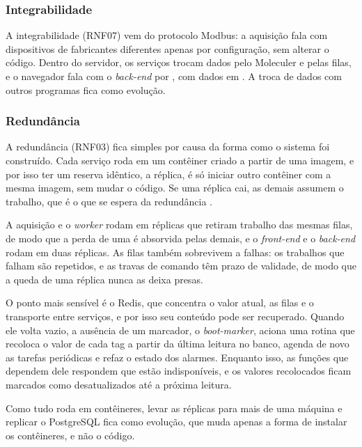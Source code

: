 \subsubsection{Integrabilidade}

\par A integrabilidade (RNF07) vem do protocolo Modbus: a aquisição fala com dispositivos de fabricantes diferentes apenas por configuração, sem alterar o código. Dentro do servidor, os serviços trocam dados pelo Moleculer e pelas filas, e o navegador fala com o \emph{back-end} por , com dados em . A troca de dados com outros programas fica como evolução.

\subsubsection{Redundância}

\par A redundância (RNF03) fica simples por causa da forma como o sistema foi construído. Cada serviço roda em um contêiner criado a partir de uma imagem, e por isso ter um reserva idêntico, a réplica, é só iniciar outro contêiner com a mesma imagem, sem mudar o código. Se uma réplica cai, as demais assumem o trabalho, que é o que se espera da redundância \cite{ZANGHI2019_SCADA_CONCEITOS}.

\par A aquisição e o \emph{worker} rodam em réplicas que retiram trabalho das mesmas filas, de modo que a perda de uma é absorvida pelas demais, e o \emph{front-end} e o \emph{back-end} rodam em duas réplicas. As filas também sobrevivem a falhas: os trabalhos que falham são repetidos, e as travas de comando têm prazo de validade, de modo que a queda de uma réplica nunca as deixa presas.

\par O ponto mais sensível é o Redis, que concentra o valor atual, as filas e o transporte entre serviços, e por isso seu conteúdo pode ser recuperado. Quando ele volta vazio, a ausência de um marcador, o \emph{boot-marker}, aciona uma rotina que recoloca o valor de cada tag a partir da última leitura no banco, agenda de novo as tarefas periódicas e refaz o estado dos alarmes. Enquanto isso, as funções que dependem dele respondem que estão indisponíveis, e os valores recolocados ficam marcados como desatualizados até a próxima leitura.

\par Como tudo roda em contêineres, levar as réplicas para mais de uma máquina e replicar o PostgreSQL fica como evolução, que muda apenas a forma de instalar os contêineres, e não o código.

